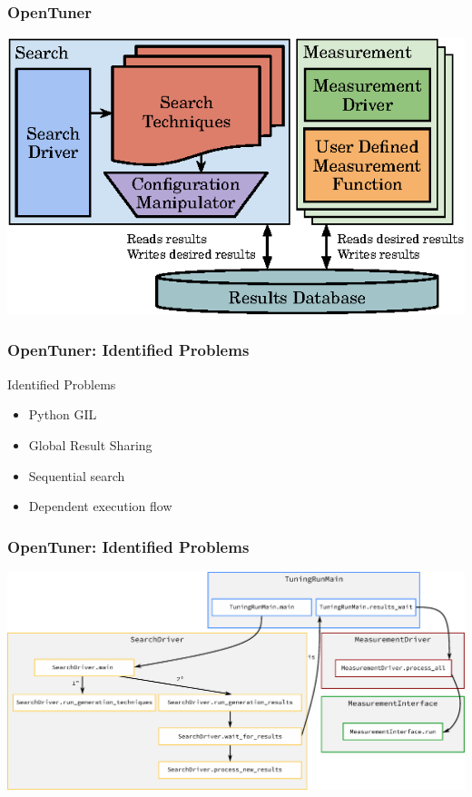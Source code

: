 \documentclass[10pt, compress, aspectratio=169]{beamer}
\begin{document}
\begin{frame}
    \frametitle{OpenTuner}
    \begin{center}
        \includegraphics[width=.6\textwidth]{opentuner_arch}
    \end{center}
\end{frame}

\begin{frame}
    \frametitle{OpenTuner: Identified Problems}
        \begin{block}{Identified Problems}
            \begin{center}
                \begin{itemize}
                    \item Python \alert{GIL}
                    \item \alert{Global Result Sharing}
                    \item \alert{Sequential search}
                    \item \alert{Dependent execution flow}
                \end{itemize}
            \end{center}
        \end{block}
\end{frame}

\begin{frame}
    \frametitle{OpenTuner: Identified Problems}
    \begin{center}
        \includegraphics[width=\textwidth]{opentuner_callgraph}
    \end{center}
\end{frame}
\end{document}
